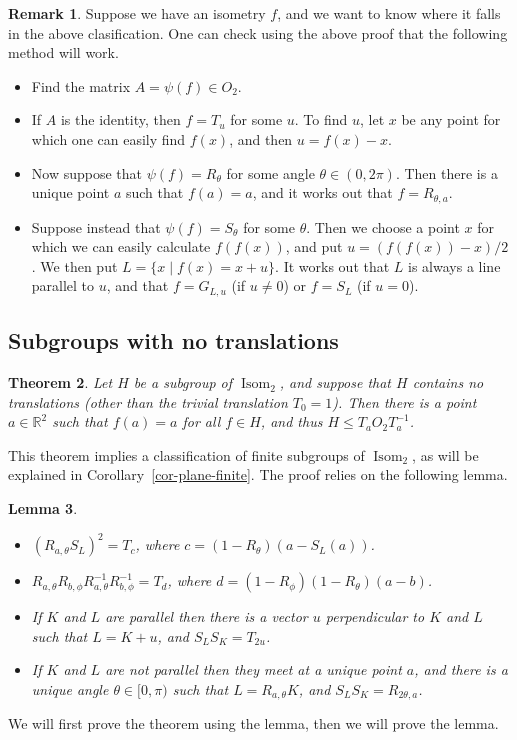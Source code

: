 \documentclass{amsart}
\DeclareMathOperator{\Isom}     {Isom}
\newcommand{\R}         {{\mathbb{R}}}
\newcommand{\st}        {\;|\;}
\newcommand{\tht}       {\theta}
\renewcommand{\:}{\colon}
\newtheorem{theorem}{Theorem}[section]
\newtheorem{lemma}[theorem]{Lemma}
\theoremstyle{definition}
\newtheorem{remark}[theorem]{Remark}
\begin{document}
\begin{remark}\label{rem-isom-classify}
 Suppose we have an isometry $f$, and we want to know where it falls
 in the above clasification.  One can check using the above proof that
 the following method will work.
 \begin{itemize}
  \item[(a)] Find the matrix $A=\psi(f)\in O_2$.
  \item[(b)] If $A$ is the identity, then $f=T_u$ for some $u$.  To
   find $u$, let $x$ be any point for which one can easily find
   $f(x)$, and then $u=f(x)-x$.
  \item[(c)] Now suppose that $\psi(f)=R_\tht$ for some angle
   $\tht\in(0,2\pi)$.  Then there is a unique point $a$ such that
   $f(a)=a$, and it works out that $f=R_{\tht,a}$.
  \item[(d)] Suppose instead that $\psi(f)=S_\tht$ for some $\tht$.
   Then we choose a point $x$ for which we can easily calculate
   $f(f(x))$, and put $u=(f(f(x))-x)/2$.  We then put
   $L=\{x\st f(x)=x+u\}$.  It works out that $L$ is always a line
   parallel to $u$, and that $f=G_{L,u}$ (if $u\neq 0$) or $f=S_L$
   (if $u=0$).  
 \end{itemize}
\end{remark}

\subsection{Subgroups with no translations}

\begin{theorem}\label{thm-no-trans}
 Let $H$ be a subgroup of $\Isom_2$, and suppose that $H$ contains no
 translations (other than the trivial translation $T_0=1$).  Then
 there is a point $a\in\R^2$ such that $f(a)=a$ for all $f\in H$, and
 thus $H\leq T_a O_2 T_a^{-1}$.
\end{theorem}

This theorem implies a classification of finite subgroups of $\Isom_2$, as
will be explained in Corollary~\ref{cor-plane-finite}.  The proof relies
on the following lemma.
\begin{lemma}\label{lem-no-trans}
 \begin{itemize}
  \item[(a)] $(R_{a,\theta}S_L)^2=T_c$, where $c=(1-R_\theta)(a-S_L(a))$.
  \item[(b)] $R_{a,\theta}R_{b,\phi}R_{a,\theta}^{-1}R_{b,\phi}^{-1}=T_d$,
   where $d=(1-R_\phi)(1-R_\tht)(a-b)$.
  \item[(c)] If $K$ and $L$ are parallel then there is a vector $u$
   perpendicular to $K$ and $L$ such that $L=K+u$, and
   $S_LS_K=T_{2u}$.
  \item[(d)] If $K$ and $L$ are not parallel then they meet at a
   unique point $a$, and there is a unique angle $\theta\in[0,\pi)$
   such that $L=R_{a,\theta}K$, and $S_LS_K=R_{2\theta,a}$.
 \end{itemize}
\end{lemma}
We will first prove the theorem using the lemma, then we will prove
the lemma.
\end{document}
